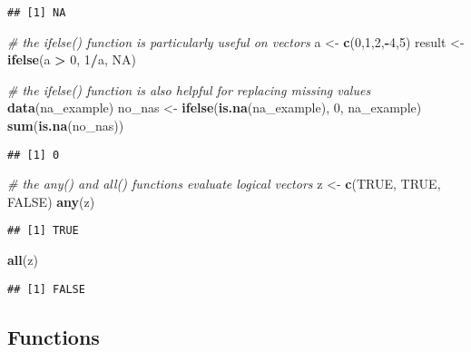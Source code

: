 \documentclass[]{article}
\newenvironment{Shaded}{\begin{snugshade}}{\end{snugshade}}
\newcommand{\CommentTok}[1]{\textcolor[rgb]{0.56,0.35,0.01}{\textit{#1}}}
\newcommand{\DecValTok}[1]{\textcolor[rgb]{0.00,0.00,0.81}{#1}}
\newcommand{\KeywordTok}[1]{\textcolor[rgb]{0.13,0.29,0.53}{\textbf{#1}}}
\newcommand{\NormalTok}[1]{#1}
\newcommand{\OperatorTok}[1]{\textcolor[rgb]{0.81,0.36,0.00}{\textbf{#1}}}
\newcommand{\OtherTok}[1]{\textcolor[rgb]{0.56,0.35,0.01}{#1}}
\newcommand{\StringTok}[1]{\textcolor[rgb]{0.31,0.60,0.02}{#1}}
\begin{document}
\begin{verbatim}
## [1] NA
\end{verbatim}

\begin{Shaded}
\begin{Highlighting}[]
\CommentTok{# the ifelse() function is particularly useful on vectors}
\NormalTok{a <-}\StringTok{ }\KeywordTok{c}\NormalTok{(}\DecValTok{0}\NormalTok{,}\DecValTok{1}\NormalTok{,}\DecValTok{2}\NormalTok{,}\OperatorTok{-}\DecValTok{4}\NormalTok{,}\DecValTok{5}\NormalTok{)}
\NormalTok{result <-}\StringTok{ }\KeywordTok{ifelse}\NormalTok{(a }\OperatorTok{>}\StringTok{ }\DecValTok{0}\NormalTok{, }\DecValTok{1}\OperatorTok{/}\NormalTok{a, }\OtherTok{NA}\NormalTok{)}

\CommentTok{# the ifelse() function is also helpful for replacing missing values}
\KeywordTok{data}\NormalTok{(na_example)}
\NormalTok{no_nas <-}\StringTok{ }\KeywordTok{ifelse}\NormalTok{(}\KeywordTok{is.na}\NormalTok{(na_example), }\DecValTok{0}\NormalTok{, na_example) }
\KeywordTok{sum}\NormalTok{(}\KeywordTok{is.na}\NormalTok{(no_nas))}
\end{Highlighting}
\end{Shaded}

\begin{verbatim}
## [1] 0
\end{verbatim}

\begin{Shaded}
\begin{Highlighting}[]
\CommentTok{# the any() and all() functions evaluate logical vectors}
\NormalTok{z <-}\StringTok{ }\KeywordTok{c}\NormalTok{(}\OtherTok{TRUE}\NormalTok{, }\OtherTok{TRUE}\NormalTok{, }\OtherTok{FALSE}\NormalTok{)}
\KeywordTok{any}\NormalTok{(z)}
\end{Highlighting}
\end{Shaded}

\begin{verbatim}
## [1] TRUE
\end{verbatim}

\begin{Shaded}
\begin{Highlighting}[]
\KeywordTok{all}\NormalTok{(z)}
\end{Highlighting}
\end{Shaded}

\begin{verbatim}
## [1] FALSE
\end{verbatim}

\hypertarget{functions}{%
\subsection{Functions}\label{functions}}
\end{document}
